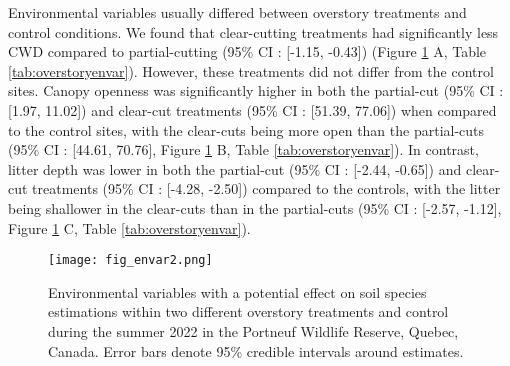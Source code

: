 Environmental variables usually differed between overstory treatments and control conditions.
We found that clear-cutting treatments had significantly less CWD compared to partial-cutting
(95\% CI : [-1.15, -0.43]) (Figure \ref{fig:envar} A, Table \ref{tab:overstoryenvar}). 
However, these treatments did not differ from the control sites. 
Canopy openness was significantly higher in both the partial-cut (95\% CI : [1.97, 11.02]) and clear-cut treatments (95\% CI : [51.39, 77.06]) when compared 
to the control sites, with the clear-cuts being more open than the partial-cuts (95\% CI : [44.61, 70.76], Figure \ref{fig:envar} B, Table \ref{tab:overstoryenvar}). 
In contrast, litter depth was lower in both the partial-cut (95\% CI : [-2.44, -0.65]) and clear-cut treatments (95\% CI : [-4.28, -2.50]) compared to the controls, 
with the litter being shallower in the clear-cuts than in the partial-cuts (95\% CI : [-2.57, -1.12], Figure \ref{fig:envar} C, Table \ref{tab:overstoryenvar}).


\vspace{10pt}

\begin{figure}[ht]
  \centering
  \texttt{[image: fig\_envar2.png]}
  \caption[Environmental variables with a potential effect on soil species within two different overstory treatments and control.]
  {Environmental variables with a potential effect on soil species estimations within two different overstory treatments and control 
  during the summer 2022 in the Portneuf Wildlife Reserve, Quebec, Canada. Error bars denote 95\% credible intervals around estimates.}
  \label{fig:envar}
\end{figure}

